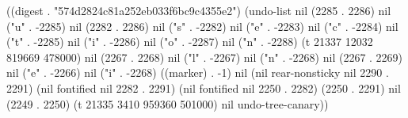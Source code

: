 
((digest . "574d2824c81a252eb033f6bc9c4355e2") (undo-list nil (2285 . 2286) nil ("u" . -2285) nil (2282 . 2286) nil ("s" . -2282) nil ("e" . -2283) nil ("c" . -2284) nil ("t" . -2285) nil ("i" . -2286) nil ("o" . -2287) nil ("n" . -2288) (t 21337 12032 819669 478000) nil (2267 . 2268) nil ("l" . -2267) nil ("n" . -2268) nil (2267 . 2269) nil ("e" . -2266) nil ("i" . -2268) ((marker) . -1) nil (nil rear-nonsticky nil 2290 . 2291) (nil fontified nil 2282 . 2291) (nil fontified nil 2250 . 2282) (2250 . 2291) nil (2249 . 2250) (t 21335 3410 959360 501000) nil undo-tree-canary))
